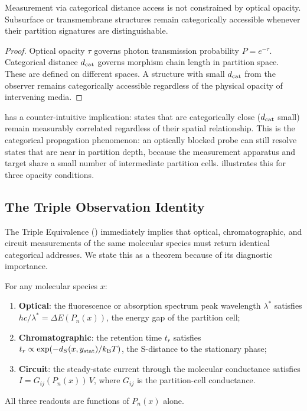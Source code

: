 \begin{corollary}
\label{cor:opacity-indep}
Measurement via categorical distance access is not constrained by optical
opacity.  Subsurface or transmembrane structures remain categorically
accessible whenever their partition signatures are distinguishable.
\end{corollary}

\begin{proof}
Optical opacity $\tau$ governs photon transmission probability
$P = e^{-\tau}$.  Categorical distance $d_{\mathrm{cat}}$ governs morphism chain length in
partition space.  These are defined on different spaces.  A structure with small
$d_{\mathrm{cat}}$ from the observer remains categorically accessible regardless of the
physical opacity of intervening media.
\end{proof}

\begin{remark}
 has a counter-intuitive implication: states that are
categorically close ($d_{\mathrm{cat}}$ small) remain measurably correlated regardless of
their spatial relationship.  This is the categorical propagation phenomenon:
an optically blocked probe can still resolve states that are near in partition
depth, because the measurement apparatus and target share a small number of
intermediate partition cells.   illustrates
this for three opacity conditions.
\end{remark}

\subsection{The Triple Observation Identity}

The Triple Equivalence () immediately implies that
optical, chromatographic, and circuit measurements of the same molecular
species must return identical categorical addresses.  We state this as a
theorem because of its diagnostic importance.

\begin{theorem}
\label{thm:triple-obs}
For any molecular species $x$:
\begin{enumerate}[label=(\roman*)]
    \item \textbf{Optical}: the fluorescence or absorption spectrum peak
          wavelength $\lambda^*$ satisfies $h c/\lambda^* = \Delta E(P_n(x))$,
          the energy gap of the partition cell;
    \item \textbf{Chromatographic}: the retention time $t_r$ satisfies
          $t_r \propto \exp(-d_S(x, y_\mathrm{stat})/k_{\mathrm{B}} T)$, the S-distance to
          the stationary phase;
    \item \textbf{Circuit}: the steady-state current through the molecular
          conductance satisfies $I = G_{ij}(P_n(x))\,V$, where $G_{ij}$ is the
          partition-cell conductance.
\end{enumerate}
All three readouts are functions of $P_n(x)$ alone.
\end{theorem}

